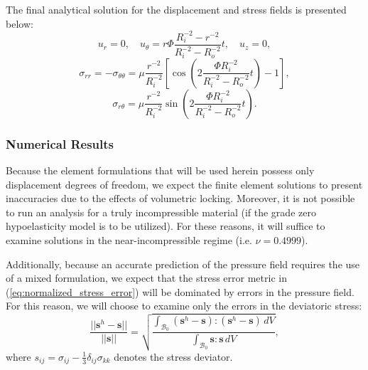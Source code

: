 The final analytical solution for the displacement and stress fields is presented below:
\begin{equation}
  u_r = 0, \quad u_\theta = r \Phi \frac{R_i^{-2} - r^{-2}}{R_i^{-2} - R_o^{-2}} t, \quad u_z = 0,
\end{equation}
\begin{equation}
  \sigma_{rr} = - \sigma_{\theta \theta} = \mu \frac{r^{-2}}{R_i^{-2}} \left[ \cos \left( 2 \frac{\Phi R_i^{-2}}{R_i^{-2} - R_o^{-2}} t \right) - 1 \right],
\end{equation}
\begin{equation}
  \sigma_{r \theta} = \mu \frac{r^{-2}}{R_i^{-2}} \sin \left( 2 \frac{\Phi R_i^{-2}}{R_i^{-2} - R_o^{-2}} t \right).
\end{equation}

\subsubsection*{Numerical Results}

Because the element formulations that will be used herein possess only displacement degrees of freedom, we expect the finite element solutions to present inaccuracies due to the effects of volumetric locking. Moreover, it is not possible to run an analysis for a truly incompressible material (if the grade zero hypoelasticity model is to be utilized). For these reasons, it will suffice to examine solutions in the near-incompressible regime (i.e. $\nu = 0.4999$).

Additionally, because an accurate prediction of the pressure field requires the use of a mixed formulation, we expect that the stress error metric in (\ref{eq:normalized_stress_error}) will be dominated by errors in the pressure field. For this reason, we will choose to examine only the errors in the deviatoric stress:
\begin{equation}
	\frac{||\mathbf{s}^h - \mathbf{s}||}{||\mathbf{s}||} = \sqrt{\frac{\int_{\mathcal{B}_0} (\mathbf{s}^h - \mathbf{s}) \colon (\mathbf{s}^h - \mathbf{s}) \, dV}{\int_{\mathcal{B}_0} \mathbf{s} \colon \mathbf{s} \, dV}},
	\label{eq:normalized_stress_error}
\end{equation}
where $s_{ij} = \sigma_{ij} - \frac{1}{3} \delta_{ij} \sigma_{kk}$ denotes the stress deviator.

